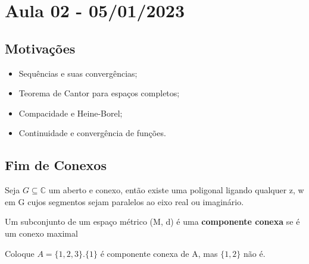 \documentclass[complex.tex]{subfiles}
\begin{document}
\section{Aula 02 - 05/01/2023}
\subsection{Motivações}
\begin{itemize}
	\item Sequências e suas convergências;
	\item Teorema de Cantor para espaços completos;
	\item Compacidade e Heine-Borel;
	\item Continuidade e convergência de funções.
\end{itemize}

\subsection{Fim de Conexos}
\begin{theorem*}
	Seja $G\subseteq{\mathbb{C}}$ um aberto e conexo, então existe uma poligonal ligando qualquer z, w em G cujos segmentos
	sejam paralelos ao eixo real ou imaginário.
\end{theorem*}

\begin{def*}
	Um subconjunto de um espaço métrico (M, d) é uma \textbf{componente conexa} se é um conexo maximal
\end{def*}

\begin{example}
	Coloque $A = \{1, 2, 3\}. \{1\}$ é componente conexa de A, mas $\{1, 2\}$ não é.
\end{example}
\end{document}
